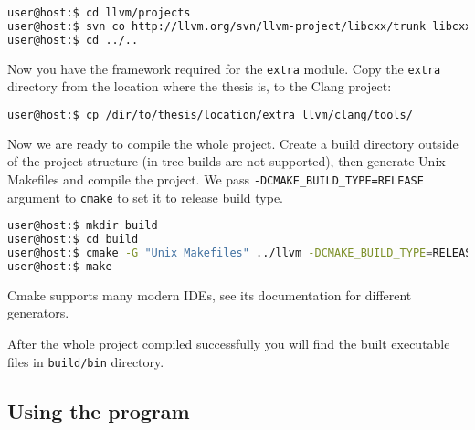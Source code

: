 \begin{lstlisting}[language=bash, frame=single]
user@host:$ cd llvm/projects
user@host:$ svn co http://llvm.org/svn/llvm-project/libcxx/trunk libcxx
user@host:$ cd ../..
\end{lstlisting}
\par Now you have the framework required for the \verb|extra| module. Copy the \verb|extra| directory from the location where the thesis is, to the Clang project:
\begin{lstlisting}[language=bash, frame=single]
user@host:$ cp /dir/to/thesis/location/extra llvm/clang/tools/
\end{lstlisting}
\par Now we are ready to compile the whole project. Create a build directory outside of the project structure (in-tree builds are not supported\cite{clang_getting_started}), then generate Unix Makefiles and compile the project. We pass \verb|-DCMAKE_BUILD_TYPE=RELEASE| argument to \verb|cmake| to set it to release build type.
\begin{lstlisting}[language=bash, frame=single]
user@host:$ mkdir build
user@host:$ cd build
user@host:$ cmake -G "Unix Makefiles" ../llvm -DCMAKE_BUILD_TYPE=RELEASE
user@host:$ make
\end{lstlisting}
\par Cmake supports many modern IDEs, see its documentation for different generators\cite{cmake_generator_doc}. \medskip
\par After the whole project compiled successfully you will find the built executable files in \verb|build/bin| directory.
\subsection{Using the program}